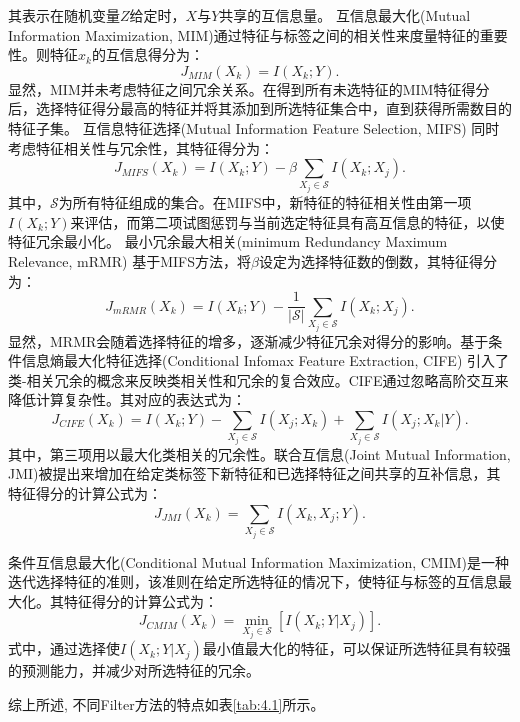 \documentclass[lang=cn,10pt]{gorgeousnbook}
\numberwithin{equation}{section}%
\numberwithin{figure}{section}%
\begin{document}
其表示在随机变量$Z$给定时，$X$与$Y$共享的互信息量。
互信息最大化(Mutual Information Maximization, MIM)通过特征与标签之间的相关性来度量特征的重要性。则特征$x_k$的互信息得分为：
\begin{equation}
J_{MIM}\left( X_k \right) =I\left( X_k;Y \right).
\end{equation}
显然，MIM并未考虑特征之间冗余关系。在得到所有未选特征的MIM特征得分后，选择特征得分最高的特征并将其添加到所选特征集合中，直到获得所需数目的特征子集。
互信息特征选择(Mutual Information Feature Selection, MIFS) 同时考虑特征相关性与冗余性，其特征得分为：
\begin{equation}
J_{MIFS}(X_k)=I(X_k;Y)-\beta\sum_{X_j\in\mathcal{S}}I(X_k;X_j).
\end{equation}
其中，$\mathcal{S}$为所有特征组成的集合。在MIFS中，新特征的特征相关性由第一项$I(X_k;Y)$来评估，而第二项试图惩罚与当前选定特征具有高互信息的特征，以使特征冗余最小化。
最小冗余最大相关(minimum Redundancy Maximum Relevance, mRMR) 基于MIFS方法，将$\beta$设定为选择特征数的倒数，其特征得分为：
\begin{equation}
J_{mRMR}(X_k)=I(X_k;Y)-\frac{1}{|\mathcal{S}|}\sum_{X_j\in\mathcal{S}}I(X_k;X_j).
\end{equation}
显然，MRMR会随着选择特征的增多，逐渐减少特征冗余对得分的影响。基于条件信息熵最大化特征选择(Conditional Infomax Feature Extraction, CIFE) 引入了类-相关冗余的概念来反映类相关性和冗余的复合效应。CIFE通过忽略高阶交互来降低计算复杂性。其对应的表达式为：
\begin{equation}
J_{CIFE}(X_k)=I(X_k;Y)-\sum_{X_j\in\mathcal{S}}I(X_j;X_k)+\sum_{X_j\in\mathcal{S}}I(X_j;X_k|Y).
\end{equation}
其中，第三项用以最大化类相关的冗余性。联合互信息(Joint Mutual Information, JMI)被提出来增加在给定类标签下新特征和已选择特征之间共享的互补信息，其特征得分的计算公式为：
\begin{equation}
J_{JMI}(X_k)=\sum_{X_j\in\mathcal{S}}I(X_k,X_j;Y).
\end{equation}

条件互信息最大化(Conditional Mutual Information Maximization, CMIM)是一种迭代选择特征的准则，该准则在给定所选特征的情况下，使特征与标签的互信息最大化。其特征得分的计算公式为：
\begin{equation}
J_{CMIM}(X_k)=\min_{X_j\in\mathcal{S}}[I(X_k;Y|X_j)].
\end{equation}
式中，通过选择使$I(X_k;Y|X_j)$最小值最大化的特征，可以保证所选特征具有较强的预测能力，并减少对所选特征的冗余。

综上所述, 不同Filter方法的特点如表\ref{tab:4.1}所示。
\end{document}
